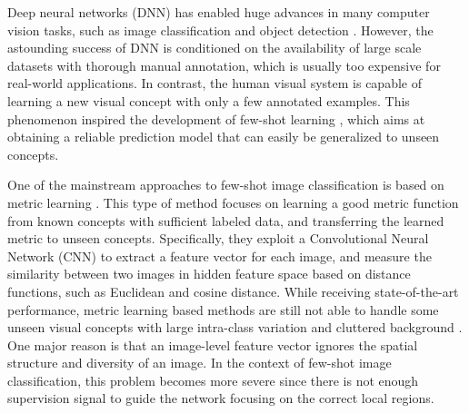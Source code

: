 Deep neural networks (DNN) has enabled huge advances in many computer vision tasks, such as image classification \cite{russakovsky2015imagenet} and object detection \cite{fasterrcnn}. %
However, the astounding success of DNN is conditioned on the availability of large scale datasets with thorough manual annotation, which is usually too expensive for real-world applications.
In contrast, the human visual system is capable of learning a new visual concept with only a few annotated examples.
This phenomenon inspired the development of few-shot learning \cite{snell2017prototypical,finn2017model,lee2019meta,zhang2020deepemd,li2019revisiting,Sachin2017,vinyals2016matching,relationnet,ye2020few}, which aims at obtaining a reliable prediction model that can easily be generalized to unseen concepts.

One of the mainstream approaches to few-shot image classification is based on metric learning \cite{snell2017prototypical,vinyals2016matching,relationnet,ye2020few}.
This type of method focuses on learning a good metric function from known concepts with sufficient labeled data, and transferring the learned metric to unseen concepts.
Specifically, they exploit a Convolutional Neural Network (CNN) to extract a feature vector for each image, and measure the similarity between two images in hidden feature space based on distance functions, such as Euclidean and cosine distance.
While receiving state-of-the-art performance, metric learning based methods are still not able to handle some unseen visual concepts with large intra-class variation and cluttered background \cite{zhang2020deepemd}.
One major reason is that an image-level feature vector ignores the spatial structure and diversity of an image.
In the context of few-shot image classification, this problem becomes more severe since there is not enough supervision signal to guide the network focusing on the correct local regions.

